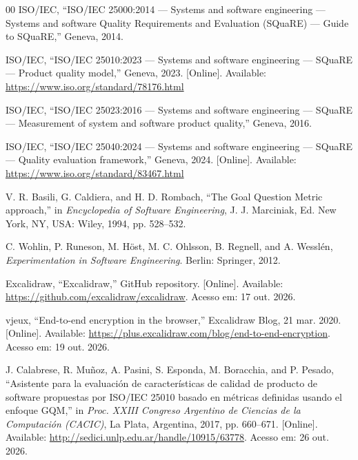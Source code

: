 \documentclass[conference]{IEEEtran}
\begin{document}
\begin{thebibliography}{00}
 ISO/IEC, ``ISO/IEC 25000:2014 --- Systems and software
engineering --- Systems and software Quality Requirements and Evaluation
(SQuaRE) --- Guide to SQuaRE,'' Geneva, 2014.

 ISO/IEC, ``ISO/IEC 25010:2023 --- Systems and software
engineering --- SQuaRE --- Product quality model,'' Geneva, 2023. [Online].
Available: \url{https://www.iso.org/standard/78176.html}

 ISO/IEC, ``ISO/IEC 25023:2016 --- Systems and software
engineering --- SQuaRE --- Measurement of system and software product
quality,'' Geneva, 2016.

 ISO/IEC, ``ISO/IEC 25040:2024 --- Systems and software
engineering --- SQuaRE --- Quality evaluation framework,'' Geneva, 2024.
[Online]. Available: \url{https://www.iso.org/standard/83467.html}

 V. R. Basili, G. Caldiera, and H. D. Rombach, ``The Goal
Question Metric approach,'' in \textit{Encyclopedia of Software Engineering},
J. J. Marciniak, Ed. New York, NY, USA: Wiley, 1994, pp. 528--532.

 C. Wohlin, P. Runeson, M. H\"{o}st, M. C. Ohlsson,
B. Regnell, and A. Wessl\'{e}n, \textit{Experimentation in Software
Engineering}. Berlin: Springer, 2012.

 Excalidraw, ``Excalidraw,'' GitHub repository.
[Online]. Available: \url{https://github.com/excalidraw/excalidraw}.
Acesso em: 17 out. 2026.

 vjeux, ``End-to-end encryption in the browser,''
Excalidraw Blog, 21 mar. 2020.
[Online]. Available: \url{https://plus.excalidraw.com/blog/end-to-end-encryption}.
Acesso em: 19 out. 2026.

 J. Calabrese, R. Muñoz, A. Pasini, S. Esponda,
M. Boracchia, and P. Pesado, ``Asistente para la evaluación de
características de calidad de producto de software propuestas por ISO/IEC
25010 basado en métricas definidas usando el enfoque GQM,'' in \textit{Proc.
XXIII Congreso Argentino de Ciencias de la Computación (CACIC)}, La Plata,
Argentina, 2017, pp. 660--671. [Online]. Available:
\url{http://sedici.unlp.edu.ar/handle/10915/63778}. Acesso em: 26 out. 2026.


\end{thebibliography}
\end{document}
